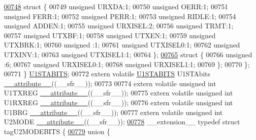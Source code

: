 \begin{DoxyCode}
\hypertarget{a00015_source_l00748}{}\hyperlink{a00015}{00748}     \textcolor{keyword}{struct }\{
00749       \textcolor{keywordtype}{unsigned} URXDA:1;
00750       \textcolor{keywordtype}{unsigned} OERR:1;
00751       \textcolor{keywordtype}{unsigned} FERR:1;
00752       \textcolor{keywordtype}{unsigned} PERR:1;
00753       \textcolor{keywordtype}{unsigned} RIDLE:1;
00754       \textcolor{keywordtype}{unsigned} ADDEN:1;
00755       \textcolor{keywordtype}{unsigned} URXISEL:2;
00756       \textcolor{keywordtype}{unsigned} TRMT:1;
00757       \textcolor{keywordtype}{unsigned} UTXBF:1;
00758       \textcolor{keywordtype}{unsigned} UTXEN:1;
00759       \textcolor{keywordtype}{unsigned} UTXBRK:1;
00760       \textcolor{keywordtype}{unsigned} :1;
00761       \textcolor{keywordtype}{unsigned} UTXISEL0:1;
00762       \textcolor{keywordtype}{unsigned} UTXINV:1;
00763       \textcolor{keywordtype}{unsigned} UTXISEL1:1;
00764     \};
\hypertarget{a00015_source_l00765}{}\hyperlink{a00015}{00765}     \textcolor{keyword}{struct }\{
00766       \textcolor{keywordtype}{unsigned} :6;
00767       \textcolor{keywordtype}{unsigned} URXISEL0:1;
00768       \textcolor{keywordtype}{unsigned} URXISEL1:1;
00769     \};
00770   \};
00771 \} \hyperlink{a00014_d2/dc7/a00838}{U1STABITS};
00772 \textcolor{keyword}{extern} \textcolor{keyword}{volatile} \hyperlink{a00014_d2/dc7/a00838}{U1STABITS} U1STAbits \hyperlink{a00015_a493c46f03454991ccc5aa7a6e1dfb2a7}{\_\_attribute\_\_}((\_\_sfr\_\_));
00773 
00774 \textcolor{keyword}{extern} \textcolor{keyword}{volatile} \textcolor{keywordtype}{unsigned} \textcolor{keywordtype}{int}  U1TXREG \hyperlink{a00015_a493c46f03454991ccc5aa7a6e1dfb2a7}{\_\_attribute\_\_}((\_\_sfr\_\_));
00775 \textcolor{keyword}{extern} \textcolor{keyword}{volatile} \textcolor{keywordtype}{unsigned} \textcolor{keywordtype}{int}  U1RXREG \hyperlink{a00015_a493c46f03454991ccc5aa7a6e1dfb2a7}{\_\_attribute\_\_}((\_\_sfr\_\_));
00776 \textcolor{keyword}{extern} \textcolor{keyword}{volatile} \textcolor{keywordtype}{unsigned} \textcolor{keywordtype}{int}  U1BRG \hyperlink{a00015_a493c46f03454991ccc5aa7a6e1dfb2a7}{\_\_attribute\_\_}((\_\_sfr\_\_));
00777 \textcolor{keyword}{extern} \textcolor{keyword}{volatile} \textcolor{keywordtype}{unsigned} \textcolor{keywordtype}{int}  U2MODE \hyperlink{a00015_a493c46f03454991ccc5aa7a6e1dfb2a7}{\_\_attribute\_\_}((\_\_sfr\_\_));
\hypertarget{a00015_source_l00778}{}\hyperlink{a00014}{00778} \_\_extension\_\_ \textcolor{keyword}{typedef} \textcolor{keyword}{struct }tagU2MODEBITS \{
\hypertarget{a00015_source_l00779}{}\hyperlink{a00015}{00779}   \textcolor{keyword}{union }\{

\end{DoxyCode}
